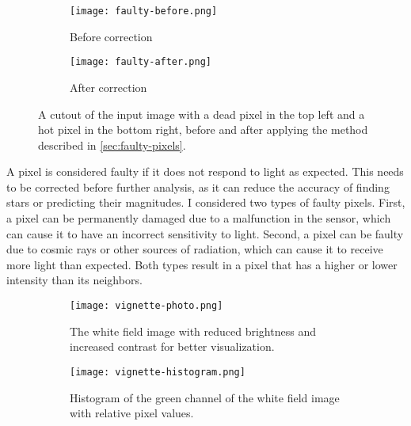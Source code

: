 \begin{figure}[tb]
  \centering
  \begin{subfigure}{.49\textwidth}
    \centering
    \texttt{[image: faulty-before.png]}
    \caption{Before correction}
    \label{fig:faulty-before}
  \end{subfigure}%
  \hfill
  \begin{subfigure}{.49\textwidth}
    \centering
    \texttt{[image: faulty-after.png]}
    \caption{After correction}
    \label{fig:faulty-after}
  \end{subfigure}
  \caption{A cutout of the input image with a dead pixel in the top left and a hot pixel
    in the bottom right, before and after applying the method described in
    \autoref{sec:faulty-pixels}.}
  \label{fig:faulty-pixels}
\end{figure}

A pixel is considered faulty if it does not respond to light as expected. This needs to be
corrected before further analysis, as it can reduce the accuracy of finding stars or
predicting their magnitudes. I considered two types of faulty pixels. First, a pixel can
be permanently damaged due to a malfunction in the sensor, which can cause it to have an
incorrect sensitivity to light. Second, a pixel can be faulty due to cosmic rays or other
sources of radiation, which can cause it to receive more light than expected. Both types
result in a pixel that has a higher or lower intensity than its neighbors.

\begin{figure}[tbp]
  \centering
  \begin{subfigure}{.49\textwidth}
    \centering
    \texttt{[image: vignette-photo.png]}
    \caption{The white field image with reduced brightness and increased contrast for better visualization.}
    \label{fig:vignette-photo}
  \end{subfigure}%
  \hfill
  \begin{subfigure}{.49\textwidth}
    \centering
    \texttt{[image: vignette-histogram.png]}
    \caption{Histogram of the green channel of the white field image with relative pixel values.}
    \label{fig:vignette-histogram}
  \end{subfigure}
  \caption{}
\end{figure}

